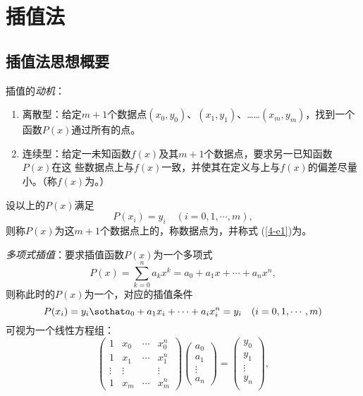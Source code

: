 \chapter{插值法}
\section{插值法思想概要}
\entry 插值的\emph{动机}：
\begin{enumerate}\tl
    \item 离散型：给定$m+1$个数据点$(x_0,y_0)$、$(x_1,y_1)$、……$(x_m,y_m)$，找到一个函数$P(x)$通过所有的点。
    \item 连续型：给定一未知函数$f(x)$及其$m+1$个数据点，要求另一已知函数$P(x)$在这
    些数据点上与$f(x)$一致，并使其在定义与上与$f(x)$的偏差尽量小。（称$f(x)$为。）
\end{enumerate}

 设以上的$P(x)$满足
\begin{equation}\label{4-e1}
P(x_i)=y_i\quad(i=0,1,\cdots,m),
\end{equation}
则称$P(x)$为这$m+1$个数据点上的，称数据点为，并称式
(\ref{4-e1})为。

\entry \emph{多项式插值}：要求插值函数$P(x)$为一个多项式
\begin{equation}
P(x)=\sum_{k=0}^na_kx^k=a_0+a_1x+\cdots+a_nx^n,
\end{equation}
则称此时的$P(x)$为一个，对应的插值条件
\begin{equation}
P(x_i)=y_i\sothat a_0+a_1x_i+\cdots+a_ix_i^n=y_i\quad(i=0,1,\cdots,m)
\end{equation}
可视为一个线性方程组：
\begin{equation}\label{4-e2}
\begin{pmatrix}1&x_0&\cdots&x_0^n\\1&x_1&\cdots&x_1^n\\\vdots&\vdots&&\vdots\\
1&x_m&\cdots&x_m^n\end{pmatrix}\begin{pmatrix}a_0\\a_1\\\vdots\\a_n\end{pmatrix}
=\begin{pmatrix}y_0\\y_1\\\vdots\\y_n\\\end{pmatrix},
\end{equation}

